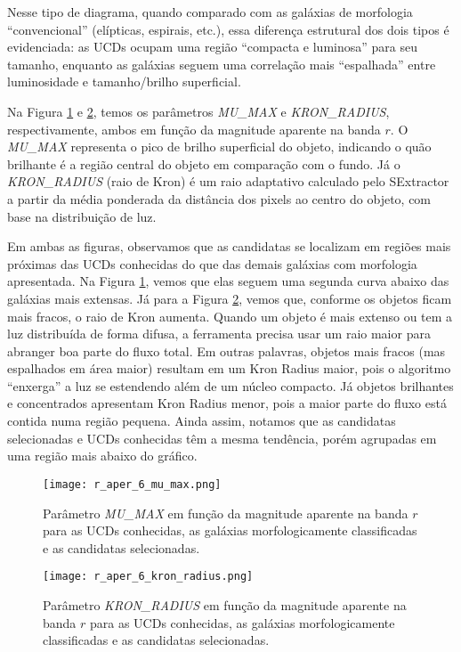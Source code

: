 Nesse tipo de diagrama, quando comparado com as galáxias de morfologia “convencional” (elípticas, espirais, etc.), essa diferença estrutural dos dois tipos é evidenciada: as UCDs ocupam uma região “compacta e luminosa” para seu tamanho, enquanto as galáxias seguem uma correlação mais “espalhada” entre luminosidade e tamanho/brilho superficial.

Na Figura \ref{r_aper_6_mu_max} e \ref{r_aper_6_kron_radius}, temos os parâmetros \textit{MU\_MAX} e \textit{KRON\_RADIUS}, respectivamente, ambos em função da magnitude aparente na banda $r$. O \textit{MU\_MAX} representa o pico de brilho superficial do objeto, indicando o quão brilhante é a região central do objeto em comparação com o fundo. Já o \textit{KRON\_RADIUS} (raio de Kron) é um raio adaptativo calculado pelo SExtractor a partir da média ponderada da distância dos pixels ao centro do objeto, com base na distribuição de luz.

Em ambas as figuras, observamos que as candidatas se localizam em regiões mais próximas das UCDs conhecidas do que das demais galáxias com morfologia apresentada. Na Figura \ref{r_aper_6_mu_max}, vemos que elas seguem uma segunda curva abaixo das galáxias mais extensas. Já para a Figura \ref{r_aper_6_kron_radius}, vemos que, conforme os objetos ficam mais fracos, o raio de Kron aumenta. Quando um objeto é mais extenso ou tem a luz distribuída de forma difusa, a ferramenta precisa usar um raio maior para abranger boa parte do fluxo total. Em outras palavras, objetos mais fracos (mas espalhados em área maior) resultam em um Kron Radius maior, pois o algoritmo “enxerga” a luz se estendendo além de um núcleo compacto. Já objetos brilhantes e concentrados apresentam Kron Radius menor, pois a maior parte do fluxo está contida numa região pequena. Ainda assim, notamos que as candidatas selecionadas e UCDs conhecidas têm a mesma tendência, porém agrupadas em uma região mais abaixo do gráfico.

\begin{figure}[!ht]
    \begin{center}
    \texttt{[image: r\_aper\_6\_mu\_max.png]}
    \caption[]{Parâmetro \textit{MU\_MAX} em função da magnitude aparente na banda $r$ para as UCDs conhecidas, as galáxias morfologicamente classificadas e as candidatas selecionadas.}
    \label{r_aper_6_mu_max}
    \end{center}
\end{figure}


\begin{figure}[!ht]
    \begin{center}
    \texttt{[image: r\_aper\_6\_kron\_radius.png]}
    \caption[]{Parâmetro \textit{KRON\_RADIUS} em função da magnitude aparente na banda $r$ para as UCDs conhecidas, as galáxias morfologicamente classificadas e as candidatas selecionadas.}
    \label{r_aper_6_kron_radius}
    \end{center}
\end{figure}


